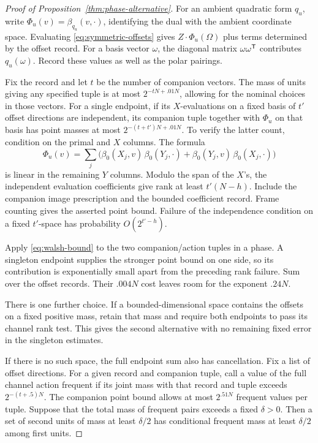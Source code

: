 \begin{proof}[Proof of Proposition~\ref{thm:phase-alternative}]
For an ambient quadratic form \(q_u\), write
\(\Phi_u(v)=\beta_{q_u}(v,\cdot)\), identifying the dual with the
ambient coordinate space. Evaluating \eqref{eq:symmetric-offsets} gives
\(Z\cdot\Phi_u(\Omega)\) plus terms determined by the offset record.
For a basis vector \(\omega\), the diagonal matrix
\(\omega\omega^{\mathsf T}\) contributes \(q_u(\omega)\). Record these values
as well as the polar pairings.

Fix the record and let \(t\) be the number of companion vectors.
The mass of units giving any specified tuple is at most
\(2^{-tN+.01N}\), allowing for the nominal choices in those vectors.
For a single endpoint, if its \(X\)-evaluations on a fixed basis of \(t'\) offset directions
are independent, its companion tuple together with \(\Phi_u\) on that
basis has point masses at most \(2^{-(t+t')N+.01N}\).
To verify the latter count, condition on the primal and \(X\) columns.
The formula
\[
 \Phi_u(v)=\sum_j\bigl(\beta_0(X_j,v)\,\beta_0(Y_j,\cdot)
                  +\beta_0(Y_j,v)\,\beta_0(X_j,\cdot)\bigr)
\]
is linear in the remaining \(Y\) columns. Modulo the span of the \(X\)'s,
the independent evaluation coefficients give rank at least \(t'(N-h)\).
Include the companion image prescription and the bounded coefficient
record. Frame counting gives the asserted point bound. Failure of the
independence condition on a fixed \(t'\)-space has probability
\(O(2^{t'-h})\).

Apply \eqref{eq:walsh-bound} to the two companion/action tuples in a phase.
A singleton endpoint supplies the stronger point bound on one side, so
its contribution is exponentially small apart from the preceding rank
failure. Sum over the offset records. Their \(.004N\) cost leaves room
for the exponent \(.24N\).

There is one further choice. If a bounded-dimensional space contains the
offsets on a fixed positive mass, retain that mass and require both
endpoints to pass its channel rank test. This gives the second alternative
with no remaining fixed error in the singleton estimates.

If there is no such space, the full endpoint sum also has cancellation.
Fix a list of offset directions. For a given record and companion
tuple, call a value of the full channel action frequent if its joint mass
with that record and tuple exceeds \(2^{-(t+.5)N}\). The companion
point bound allows at most \(2^{.51N}\) frequent values per tuple.
Suppose that the total mass of frequent pairs exceeds a fixed
\(\delta>0\). Then a set of second units of mass at least \(\delta/2\)
has conditional frequent mass at least \(\delta/2\) among first units.


\end{proof}
